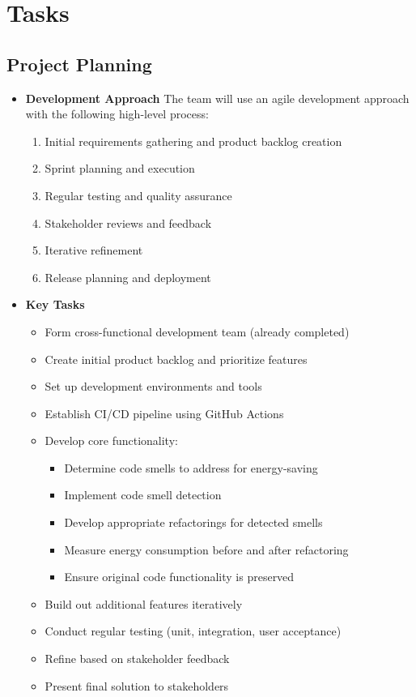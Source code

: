\documentclass[12pt]{article}
\begin{document}
\section{Tasks}
\subsection{Project Planning}
\begin{itemize}
 
  \item \textbf{Development Approach}
  The team will use an agile development approach with the following high-level process:
  \begin{enumerate}
    \item Initial requirements gathering and product backlog creation
    \item Sprint planning and execution
    \item Regular testing and quality assurance
    \item Stakeholder reviews and feedback
    \item Iterative refinement
    \item Release planning and deployment
  \end{enumerate}
  
 \item \textbf{Key Tasks}
  \begin{itemize}
    \item Form cross-functional development team (already completed) 
    \item Create initial product backlog and prioritize features
    \item Set up development environments and tools
    \item Establish CI/CD pipeline using GitHub Actions
    \item Develop core functionality:
      \begin{itemize}
        \item Determine code smells to address for energy-saving
        \item Implement code smell detection
        \item Develop appropriate refactorings for detected smells
        \item Measure energy consumption before and after refactoring
        \item Ensure original code functionality is preserved
      \end{itemize}
    \item Build out additional features iteratively
    \item Conduct regular testing (unit, integration, user acceptance)
    \item Refine based on stakeholder feedback
    \item Present final solution to stakeholders


\end{itemize}
\end{itemize}
\end{document}
